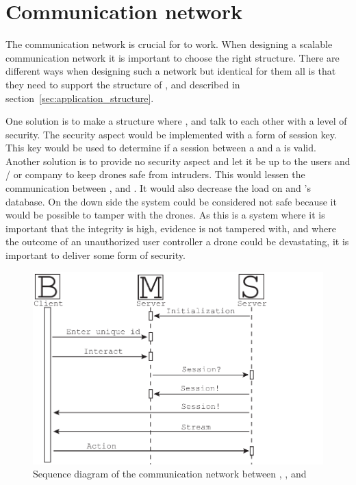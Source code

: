 \section{Communication network}

The communication network is crucial for \projectname{} to work.
When designing a scalable communication network it is important to choose the right structure.
There are different ways when designing such a network but identical for them all is that they need to support the structure of ,  and  described in section~\ref{sec:application_structure}.

One solution is to make a structure where ,  and  talk to each other with a level of security. 
The security aspect would be implemented with a form of session key. 
This key would be used to determine if a session between a  and a  is valid.
Another solution is to provide no security aspect and let it be up to the users and / or company to keep drones safe from intruders.
This would lessen the communication between ,  and .  
It would also decrease the load on  and 's database. 
On the down side the system could be considered not safe because it would be possible to tamper with the drones.
As this is a system where it is important that the integrity is high, evidence is not tampered with, and where the outcome of an unauthorized user controller a drone could be devastating, it is important to deliver some form of security.

\begin{figure}[!h]
    \centering 
    \includegraphics[width=\textwidth]{gfx/sequence_diagram.pdf}
    \caption{Sequence diagram of the communication network between , , and }
    \label{fig:sequence_diagram}
\end{figure}

